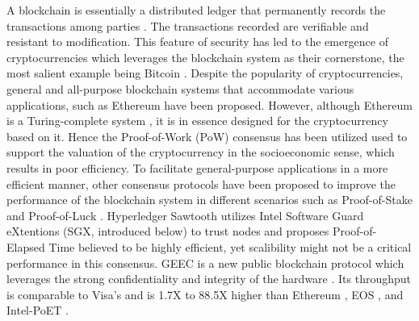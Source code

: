 %

A blockchain is essentially a distributed ledger that permanently records the transactions among parties \cite{iansiti2018truth}. The transactions recorded are verifiable and resistant to modification. This feature of security has led to the emergence of cryptocurrencies which leverages the blockchain system as their cornerstone, the most salient example being Bitcoin \cite{nakamoto2008bitcoin}. Despite the popularity of cryptocurrencies, general and all-purpose blockchain systems that accommodate various applications, such as Ethereum \cite{wood2014ethereum} have been proposed. However, although Ethereum is a Turing-complete system \cite{wood2014ethereum}, it is in essence designed for the cryptocurrency based on it. Hence the Proof-of-Work (PoW) consensus has been utilized used to support the valuation of the cryptocurrency in the socioeconomic sense, which results in poor efficiency. To facilitate general-purpose applications in a more efficient manner, other consensus protocols have been proposed to improve the performance of the blockchain system in different scenarios such as Proof-of-Stake \cite{kiayias2017ouroboros} and Proof-of-Luck \cite{milutinovic2016proof}. Hyperledger Sawtooth \cite{sawtooth} utilizes Intel Software Guard eXtentions (SGX, introduced below) to trust nodes and proposes Proof-of-Elapsed Time believed to be highly efficient, yet scalibility might not be a critical performance in this consensus. GEEC is a new public blockchain protocol which leverages the strong confidentiality and integrity of the  hardware \cite{2018arXiv180802252C}. Its throughput is comparable to Visa's and is 1.7X to 88.5X higher than Ethereum \cite{buterin2014next}, EOS \cite{eosio}, and Intel-PoET \cite{prisco2016intel}.

